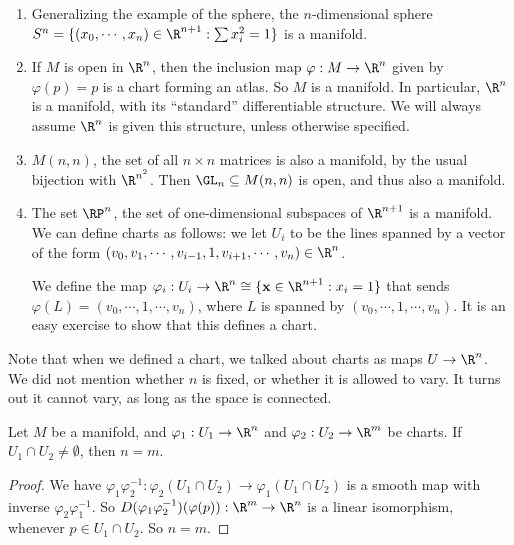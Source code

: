 \documentclass[a4paper]{article}
\begin{document}
\begin{eg}\leavevmode
  \begin{enumerate}
    \item Generalizing the example of the sphere, the $n$-dimensional sphere $S^n = \{(x_0, \cdots, x_n) \in \R^{n + 1}: \sum x_i^2 = 1\}$ is a manifold.
    \item If $M$ is open in $\R^n$, then the inclusion map $\varphi: M \to \R^n$ given by $\varphi(p) = p$ is a chart forming an atlas. So $M$ is a manifold. In particular, $\R^n$ is a manifold, with its ``standard'' differentiable structure. We will always assume $\R^n$ is given this structure, unless otherwise specified.
    \item $M(n, n)$, the set of all $n \times n$ matrices is also a manifold, by the usual bijection with $\R^{n^2}$. Then $\GL_n \subseteq M(n, n)$ is open, and thus also a manifold.
    \item The set $\RP^n$, the set of one-dimensional subspaces of $\R^{n + 1}$ is a manifold. We can define charts as follows: we let $U_i$ to be the lines spanned by a vector of the form $(v_0, v_1, \cdots, v_{i - 1}, 1, v_{i + 1}, \cdots, v_n) \in \R^n$.

      We define the map $\varphi_i: U_i \to \R^n \cong \{\mathbf{x} \in \R^{n + 1}: x_i = 1\}$ that sends $\varphi(L) = (v_0, \cdots, 1, \cdots, v_n)$, where $L$ is spanned by $(v_0, \cdots, 1, \cdots, v_n)$. It is an easy exercise to show that this defines a chart.
  \end{enumerate}
\end{eg}

Note that when we defined a chart, we talked about charts as maps $U \to \R^n$. We did not mention whether $n$ is fixed, or whether it is allowed to vary. It turns out it cannot vary, as long as the space is connected.

\begin{lemma}
  Let $M$ be a manifold, and $\varphi_1: U_1 \to \R^n$ and $\varphi_2: U_2 \to \R^m$ be charts. If $U_1 \cap U_2 \not= \emptyset$, then $n = m$.
\end{lemma}

\begin{proof}
  We have $\varphi_1 \varphi_2^{-1}: \varphi_2(U_1 \cap U_2) \to \varphi_1(U_1 \cap U_2)$ is a smooth map with inverse $\varphi_2 \varphi_1^{-1}$. So $D(\varphi_1 \varphi_2^{-1})(\varphi(p)): \R^m \to \R^n$ is a linear isomorphism, whenever $p \in U_1 \cap U_2$. So $n = m$.
\end{proof}
\end{document}
